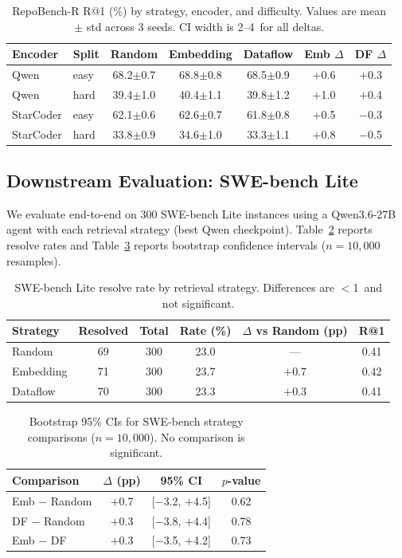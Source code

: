 \documentclass[11pt]{article}
\newcommand{\pp}{\,\text{pp}}
\begin{document}
\begin{table}[t]
\centering
\caption{RepoBench-R R@1 (\%) by strategy, encoder, and difficulty. Values are mean $\pm$ std across 3 seeds. CI width is 2--4\pp{} for all deltas.}
\label{tab:repobench}
\begin{tabular}{llccccc}
\toprule
Encoder & Split & Random & Embedding & Dataflow & Emb $\Delta$ & DF $\Delta$ \\
\midrule
Qwen     & easy & 68.2$\pm$0.7 & 68.8$\pm$0.8 & 68.5$\pm$0.9 & $+$0.6 & $+$0.3 \\
Qwen     & hard & 39.4$\pm$1.0 & 40.4$\pm$1.1 & 39.8$\pm$1.2 & $+$1.0 & $+$0.4 \\
StarCoder & easy & 62.1$\pm$0.6 & 62.6$\pm$0.7 & 61.8$\pm$0.8 & $+$0.5 & $-$0.3 \\
StarCoder & hard & 33.8$\pm$0.9 & 34.6$\pm$1.0 & 33.3$\pm$1.1 & $+$0.8 & $-$0.5 \\
\bottomrule
\end{tabular}
\end{table}

\subsection{Downstream Evaluation: SWE-bench Lite}
\label{sec:swebench}

We evaluate end-to-end on 300 SWE-bench Lite instances using a Qwen3.6-27B agent with each retrieval strategy (best Qwen checkpoint).
Table~\ref{tab:swebench} reports resolve rates and Table~\ref{tab:swebench-ci} reports bootstrap confidence intervals ($n=10{,}000$ resamples).

\begin{table}[t]
\centering
\caption{SWE-bench Lite resolve rate by retrieval strategy. Differences are $<$1\pp{} and not significant.}
\label{tab:swebench}
\begin{tabular}{lccccc}
\toprule
Strategy & Resolved & Total & Rate (\%) & $\Delta$ vs Random (pp) & R@1 \\
\midrule
Random    & 69 & 300 & 23.0 & --- & 0.41 \\
Embedding & 71 & 300 & 23.7 & $+$0.7 & 0.42 \\
Dataflow  & 70 & 300 & 23.3 & $+$0.3 & 0.41 \\
\bottomrule
\end{tabular}
\end{table}

\begin{table}[t]
\centering
\caption{Bootstrap 95\% CIs for SWE-bench strategy comparisons ($n=10{,}000$). No comparison is significant.}
\label{tab:swebench-ci}
\begin{tabular}{lccc}
\toprule
Comparison & $\Delta$ (pp) & 95\% CI & $p$-value \\
\midrule
Emb $-$ Random & $+$0.7 & [$-$3.2, $+$4.5] & 0.62 \\
DF $-$ Random  & $+$0.3 & [$-$3.8, $+$4.4] & 0.78 \\
Emb $-$ DF     & $+$0.3 & [$-$3.5, $+$4.2] & 0.73 \\
\bottomrule
\end{tabular}
\end{table}
\end{document}
